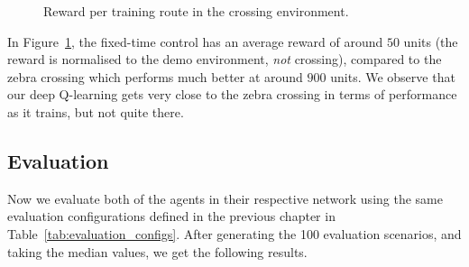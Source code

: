 \documentclass[a4paper]{report}
\begin{document}
\begin{figure}[H]
  \centering
  \caption{Reward per training route in the crossing environment.}
  \label{fig:deep_q_learning_crossing_train}
\end{figure}

In Figure~\ref{fig:deep_q_learning_crossing_train}, the fixed-time control has an average reward of around $50$ units (the reward is normalised to the demo environment, \emph{not} crossing), compared to the zebra crossing which performs much better at around $900$ units. We observe that our deep Q-learning gets very close to the zebra crossing in terms of performance as it trains, but not quite there.

\subsection{Evaluation}

Now we evaluate both of the agents in their respective network using the same evaluation configurations defined in the previous chapter in Table~\ref{tab:evaluation_configs}. After generating the 100 evaluation scenarios, and taking the median values, we get the following results.
\end{document}
